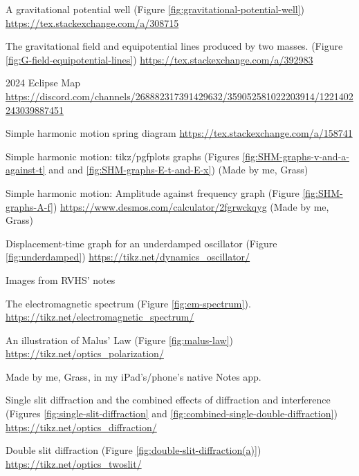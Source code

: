 \documentclass[oneside]{book}
\begin{document}
\begin{enumerate}[label={[\arabic*]}]
    \item\label{source:gravitational-potential-well} A gravitational potential well (Figure \ref{fig:gravitational-potential-well}) \url{https://tex.stackexchange.com/a/308715}
    \item\label{source:G-field-equipotential-lines} The gravitational field and equipotential lines produced by two masses. (Figure \ref{fig:G-field-equipotential-lines}) \url{https://tex.stackexchange.com/a/392983}
    \item\label{2024 Eclipse Map} 2024 Eclipse Map \url{https://discord.com/channels/268882317391429632/359052581022203914/1221402243039887451}
    \item\label{Simple harmonic motion} Simple harmonic motion spring diagram \url{https://tex.stackexchange.com/a/158741}
    \item\label{Simple harmonic motion graphs} Simple harmonic motion: tikz/pgfplots graphs (Figures \ref{fig:SHM-graphs-v-and-a-against-t} and and \ref{fig:SHM-graphs-E-t-and-E-x}) (Made by me, Grass)
    \item\label{Simple harmonic motion amplitude-vs-frequency graph} Simple harmonic motion: Amplitude against frequency graph (Figure \ref{fig:SHM-graphs-A-f}) \url{https://www.desmos.com/calculator/2fgrwckqyg} (Made by me, Grass)
    \item\label{source:underdamped} Displacement-time graph for an underdamped oscillator (Figure \ref{fig:underdamped}) \url{https://tikz.net/dynamics_oscillator/}
    \item\label{RVHS} Images from RVHS' notes
    \item\label{source:em-spectrum} The electromagnetic spectrum (Figure \ref{fig:em-spectrum}). \url{https://tikz.net/electromagnetic_spectrum/}
    \item\label{source:malus-law} An illustration of Malus' Law (Figure \ref{fig:malus-law}) \url{https://tikz.net/optics_polarization/} 
    \item\label{Me} Made by me, Grass, in my iPad's/phone's native Notes app.
    \item\label{source:single-slit-diffraction} Single slit diffraction and the combined effects of diffraction and interference (Figures \ref{fig:single-slit-diffraction} and \ref{fig:combined-single-double-diffraction}) \url{https://tikz.net/optics_diffraction/}
    \item\label{source:double-slit-diffraction(a)} Double slit diffraction (Figure \ref{fig:double-slit-diffraction(a)}) \url{https://tikz.net/optics_twoslit/}

\end{enumerate}
\end{document}
